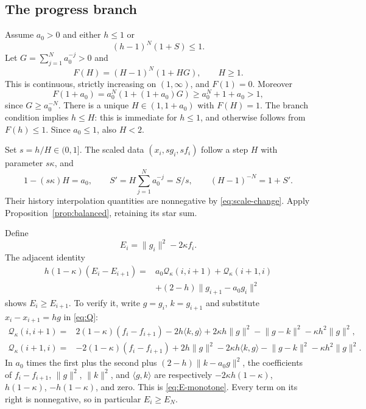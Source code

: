 \documentclass[11pt]{article}
\numberwithin{equation}{section}
\theoremstyle{remark}
\newcommand{\ip}[2]{\langle #1,#2\rangle}
\newcommand{\norm}[1]{\lVert #1\rVert}
\newcommand{\Q}{\mathcal Q}
\begin{document}
\subsection{The progress branch}

Assume $a_0>0$ and either $h\leq1$ or
\begin{equation}
(h-1)^N(1+S)\leq1.
\label{eq:progress-condition}
\end{equation}
Let $G=\sum_{j=1}^Na_0^{-j}>0$ and
\[
F(H)=(H-1)^N(1+HG),\qquad H\geq1.
\]
This is continuous, strictly increasing on $(1,\infty)$, and $F(1)=0$.
Moreover
\begin{equation}
F(1+a_0)=a_0^N(1+(1+a_0)G)
\geq a_0^N+1+a_0>1,
\label{eq:F-upper}
\end{equation}
since $G\geq a_0^{-N}$. There is a unique $H\in(1,1+a_0)$ with
$F(H)=1$. The branch condition implies $h\leq H$: this is immediate
for $h\leq1$, and otherwise follows from $F(h)\leq1$.
Since $a_0\leq1$, also $H<2$.

Set $s=h/H\in(0,1]$. The scaled data $(x_i,sg_i,sf_i)$ follow a step
$H$ with parameter $s\kappa$, and
\[
1-(s\kappa)H=a_0,\qquad
S'=H\sum_{j=1}^Na_0^{-j}=S/s,\qquad
(H-1)^{-N}=1+S'.
\]
Their history interpolation quantities are nonnegative by
\eqref{eq:scale-change}. Apply Proposition~\ref{prop:balanced},
retaining its star sum.

Define
\begin{equation}
E_i=\norm{g_i}^2-2\kappa f_i.
\label{eq:E}
\end{equation}
The adjacent identity
\begin{equation}
\begin{split}
h(1-\kappa)(E_i-E_{i+1})
={}&a_0\Q_\kappa(i,i+1)+\Q_\kappa(i+1,i)\\
&+(2-h)\norm{g_{i+1}-a_0g_i}^2
\end{split}
\label{eq:E-monotone}
\end{equation}
shows $E_i\geq E_{i+1}$. To verify it, write $g=g_i$, $k=g_{i+1}$
and substitute $x_i-x_{i+1}=hg$ in \eqref{eq:Q}:
\begin{align*}
\Q_\kappa(i,i+1)
={}&2(1-\kappa)(f_i-f_{i+1})
 -2h\ip{k}{g}+2\kappa h\norm g^2
 -\norm{g-k}^2-\kappa h^2\norm g^2,\\
\Q_\kappa(i+1,i)
={}&-2(1-\kappa)(f_i-f_{i+1})
 +2h\norm g^2-2\kappa h\ip{k}{g}
 -\norm{g-k}^2-\kappa h^2\norm g^2.
\end{align*}
In $a_0$ times the first plus the second plus
$(2-h)\norm{k-a_0g}^2$, the coefficients of $f_i-f_{i+1}$,
$\norm g^2$, $\norm k^2$, and $\ip gk$ are respectively
$-2\kappa h(1-\kappa)$, $h(1-\kappa)$, $-h(1-\kappa)$, and zero.
This is \eqref{eq:E-monotone}. Every term on its right is nonnegative,
so in particular $E_i\geq E_N$.
\end{document}
